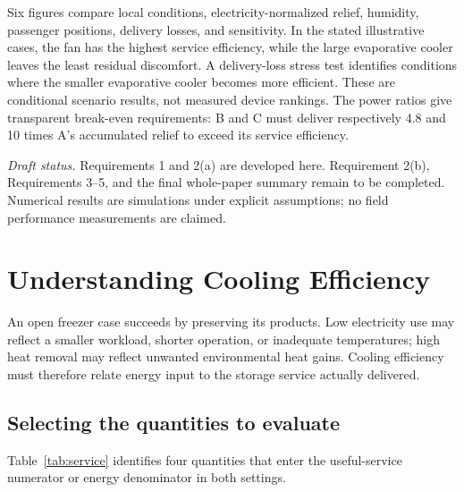 \documentclass[12pt]{article}
\begin{document}
Six figures compare local conditions, electricity-normalized relief, humidity, passenger positions, delivery losses, and sensitivity. In the stated illustrative cases, the fan has the highest service efficiency, while the large evaporative cooler leaves the least residual discomfort. A delivery-loss stress test identifies conditions where the smaller evaporative cooler becomes more efficient. These are conditional scenario results, not measured device rankings. The power ratios give transparent break-even requirements: B and C must deliver respectively 4.8 and 10 times A's accumulated relief to exceed its service efficiency.

\medskip
\noindent\textit{Draft status.} Requirements 1 and 2(a) are developed here. Requirement 2(b), Requirements 3--5, and the final whole-paper summary remain to be completed. Numerical results are simulations under explicit assumptions; no field performance measurements are claimed.

\clearpage
\pagestyle{fancy}
\tableofcontents
\clearpage

\section{Understanding Cooling Efficiency}
\label{sec:understand}

An open freezer case succeeds by preserving its products. Low electricity use may reflect a smaller workload, shorter operation, or inadequate temperatures; high heat removal may reflect unwanted environmental heat gains. Cooling efficiency must therefore relate energy input to the storage service actually delivered.

\subsection{Selecting the quantities to evaluate}

Table~\ref{tab:service} identifies four quantities that enter the useful-service numerator or energy denominator in both settings.
\end{document}
